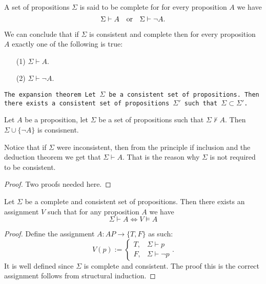 \documentclass[11pt,a4paper]{article}
\begin{document}
  \begin{definition}
    A set of propositions $\Sigma$ is said to be complete for for every
    proposition $A$ we have
    \[
      \Sigma \vdash A \quad \text{or} \quad \Sigma \vdash \neg A.
    \]
  \end{definition}

  We can conclude that if $\Sigma$ is consistent and complete then
  for every proposition $A$ exactly one of the following is true:
  \begin{enumerate}
    \item[(1)] $\Sigma \vdash A$.
    \item[(2)] $\Sigma \vdash \neg A$.
  \end{enumerate}

  \begin{theorem}\tt{The expansion theorem}
    Let $\Sigma$ be a consistent set of propositions.
    Then there exists a consistent set of propositions $\Sigma'$ such
    that $\Sigma \subset \Sigma'$.
  \end{theorem}
  \begin{lemma}
    Let $A$ be a proposition, let $\Sigma$ be a set of propositions such
    that $\Sigma \nvdash A$. Then $\Sigma \cup \{\neg A\}$ is consisnent.
  \end{lemma}
  \begin{remark}
    Notice that if $\Sigma$ were inconsistent, then from the principle
    if inclusion and the deduction theorem we get that $\Sigma \vdash A$.
    That is the reason why $\Sigma$ is not required to be consistent.
  \end{remark}
  
  \begin{proof}
    Two proofs needed here.
  \end{proof}

  \begin{lemma}
    Let $\Sigma$ be a complete and consistent set of propositions.
    Then there exists an assignment $V$ such that for any proposition
    $A$ we have
    \[
      \Sigma \vdash A \iff
      V \models A
    \]
  \end{lemma}
  \begin{proof}
    Define the assignment $A \colon AP \to \{T,F\}$ as such:
    \[
      V(p) :=
      \begin{cases}
        T, &\Sigma \vdash p \\
        F, &\Sigma \vdash \neg p
      \end{cases}.
    \]
    It is well defined since $\Sigma$ is complete and consistent.
    The proof this is the correct assignment follows from structural
    induction.
  \end{proof}
\end{document}
